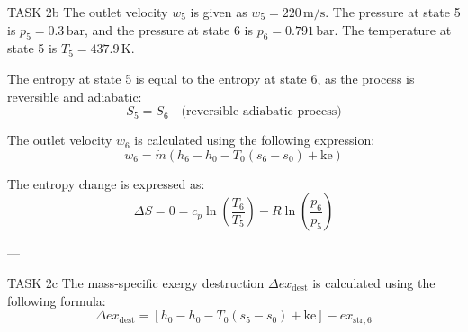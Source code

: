 TASK 2b  
The outlet velocity \( w_5 \) is given as \( w_5 = 220 \, \text{m/s} \).  
The pressure at state 5 is \( p_5 = 0.3 \, \text{bar} \), and the pressure at state 6 is \( p_6 = 0.791 \, \text{bar} \).  
The temperature at state 5 is \( T_5 = 437.9 \, \text{K} \).  

The entropy at state 5 is equal to the entropy at state 6, as the process is reversible and adiabatic:  
\[
S_5 = S_6 \quad \text{(reversible adiabatic process)}
\]

The outlet velocity \( w_6 \) is calculated using the following expression:  
\[
w_6 = \dot{m} \left( h_6 - h_0 - T_0 (s_6 - s_0) + \text{ke} \right)
\]

The entropy change is expressed as:  
\[
\Delta S = 0 = c_p \ln \left( \frac{T_6}{T_5} \right) - R \ln \left( \frac{p_6}{p_5} \right)
\]

---

TASK 2c  
The mass-specific exergy destruction \( \Delta ex_{\text{dest}} \) is calculated using the following formula:  
\[
\Delta ex_{\text{dest}} = \left[ h_0 - h_0 - T_0 (s_5 - s_0) + \text{ke} \right] - ex_{\text{str},6}
\]